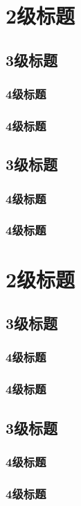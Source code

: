 \section{2级标题}
\subsection{3级标题}
\subsubsection{4级标题}
\subsubsection{4级标题}
\subsection{3级标题}
\subsubsection{4级标题}
\subsubsection{4级标题}
\section{2级标题}
\subsection{3级标题}
\subsubsection{4级标题}
\subsubsection{4级标题}
\subsection{3级标题}
\subsubsection{4级标题}
\subsubsection{4级标题}
